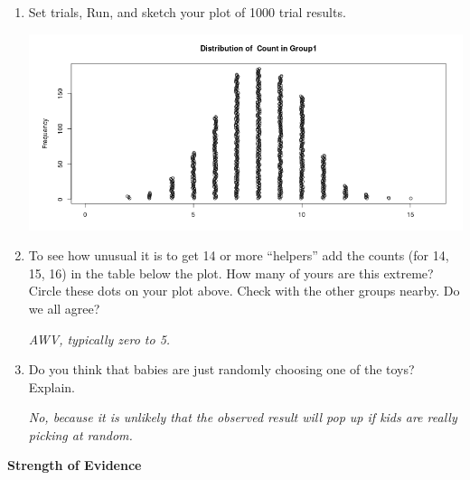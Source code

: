 \begin{enumerate}
\begin{key}
{\it 12 in my first, 8 in my second }
\end{key}

    \item  Set   trials, Run, and   
              sketch your plot of 1000 trial results. 
\begin{students}
  \vspace{4cm}
\end{students}

\begin{key}
    \includegraphics[width=.8\linewidth]{../plots/Helper16.png}
\end{key}
\item To see how unusual it is to get 14 or more ``helpers'' add the
  counts (for 14, 15, 16) in the table below the plot.
   How many of yours are this extreme? Circle
  these dots on your plot above. Check with the other groups
  nearby. Do we all agree?
\begin{students}
  \vspace{1.5cm}
\end{students}

\begin{key}
{\it  AWV, typically zero to 5.
}
\end{key}
\item  Do you think that babies are just randomly choosing one of
      the toys? Explain.
\begin{students}
  \vspace{2.5cm}
\end{students}

\begin{key}
  {\it No, because it is unlikely that the observed result will pop up
    if  kids are really picking at random. }
\end{key}

  \end{enumerate}
\begin{center}
        {\large\bf Strength of Evidence}
 \end{center}

